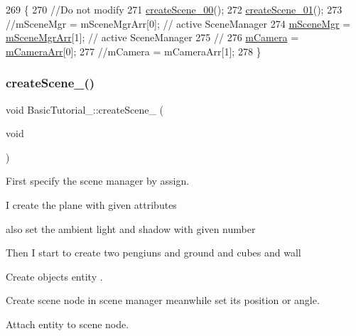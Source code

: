 \begin{DoxyCode}
269                                          \{
270     \textcolor{comment}{//Do not modify}
271     \hyperlink{class_basic_tutorial__00_aa84173e509858146cbfb98274c1ef56e}{createScene\_00}();
272     \hyperlink{class_basic_tutorial__00_aad14e1ca565797c4b7dcff31bc0e1494}{createScene\_01}();
273     \textcolor{comment}{//mSceneMgr = mSceneMgrArr[0]; // active SceneManager}
274     \hyperlink{class_base_application_a8a7684f4f9a57ed3089048ad1a913b2d}{mSceneMgr} = \hyperlink{class_basic_tutorial__00_a603779b6087698c57b7989e16d8a9b93}{mSceneMgrArr}[1]; \textcolor{comment}{// active SceneManager}
275     \textcolor{comment}{//}
276     \hyperlink{class_base_application_a3829c6b12afe911e97e6b4524b33a38b}{mCamera} = \hyperlink{class_basic_tutorial__00_af8d457d912286a98c0975c52d4faf910}{mCameraArr}[0];
277     \textcolor{comment}{//mCamera = mCameraArr[1];}
278 \}
\end{DoxyCode}
\mbox{\label{class_basic_tutorial__00_aa84173e509858146cbfb98274c1ef56e}} 
\subsubsection{\texorpdfstring{create\+Scene\+\_()}{createScene\_00()}}
{\footnotesize\ttfamily void Basic\+Tutorial\+\_\+::create\+Scene\+\_ (\begin{DoxyParamCaption}\item[{void}]{ }\end{DoxyParamCaption})\hspace{0.3cm}{\ttfamily [protected]}}



First specify the scene manager by assign. 

I create the plane with given attributes

also set the ambient light and shadow with given number

Then I start to create two pengiuns and ground and cubes and wall
\begin{DoxyEnumerate}
\item Create objects entity .
\item Create scene node in scene manager meanwhile set its position or angle.
\item Attach entity to scene node.
\end{DoxyEnumerate}

